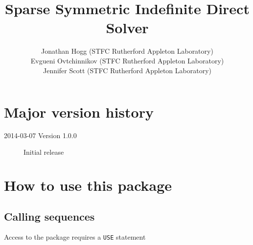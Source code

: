 \documentclass{spral}
\begin{document}
\title{Sparse Symmetric Indefinite Direct Solver}
\author{
   Jonathan Hogg (STFC Rutherford Appleton Laboratory) \\
   Evgueni Ovtchinnikov (STFC Rutherford Appleton Laboratory) \\
   Jennifer Scott (STFC Rutherford Appleton Laboratory)
}
\maketitle
\thispagestyle{firststyle}

\section*{Major version history}
\begin{description}
\item[2014-03-07 Version 1.0.0] Initial release
\end{description}


\section{How to use this package}

\subsection{Calling sequences}

Access to the package requires a {\tt USE} statement \\ \\
\indent\hspace{8mm}{\tt use spral\_ssids} \\

\medskip
\end{document}
